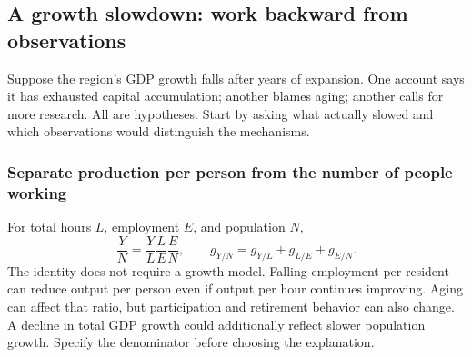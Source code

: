 \subsection{A growth slowdown: work backward from observations}

Suppose the region's GDP growth falls after years of expansion. One account
says it has exhausted capital accumulation; another blames aging; another
calls for more research. All are hypotheses. Start by asking what actually
slowed and which observations would distinguish the mechanisms.

\subsubsection{Separate production per person from the number of people working}

For total hours $L$, employment $E$, and population $N$,
\[
\frac{Y}{N}=\frac{Y}{L}\frac{L}{E}\frac{E}{N},\qquad
g_{Y/N}=g_{Y/L}+g_{L/E}+g_{E/N}.
\]
The identity does not require a growth model. Falling employment per resident
can reduce output per person even if output per hour continues improving.
Aging can affect that ratio, but participation and retirement behavior can
also change. A decline in total GDP growth could additionally reflect slower
population growth. Specify the denominator before choosing the explanation.

